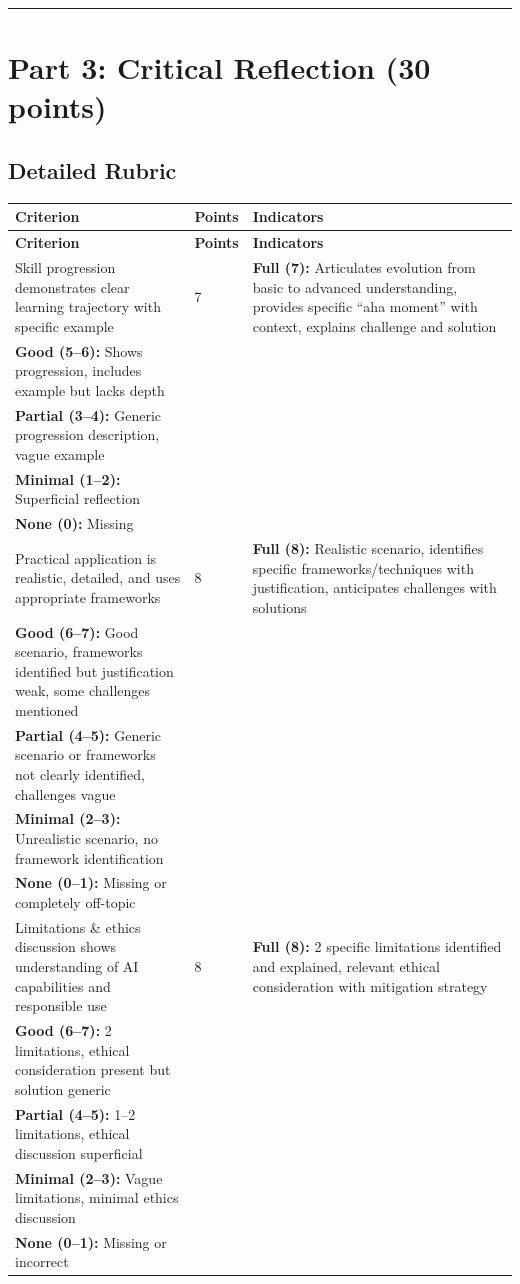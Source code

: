 \documentclass[11pt]{article}
\begin{document}
\hrule
\vspace{0.5cm}

\section{Part 3: Critical Reflection (30 points)}

\subsection*{Detailed Rubric}

\begin{longtable}{|p{5cm}|p{2cm}|p{8cm}|}
\hline
\textbf{Criterion} & \textbf{Points} & \textbf{Indicators} \\
\hline
\endfirsthead
\hline
\textbf{Criterion} & \textbf{Points} & \textbf{Indicators} \\
\hline
\endhead

Skill progression demonstrates clear learning trajectory with specific example & 7 & 
\textbf{Full (7):} Articulates evolution from basic to advanced understanding, provides specific ``aha moment'' with context, explains challenge and solution \\
\textbf{Good (5--6):} Shows progression, includes example but lacks depth \\
\textbf{Partial (3--4):} Generic progression description, vague example \\
\textbf{Minimal (1--2):} Superficial reflection \\
\textbf{None (0):} Missing \\
\hline

Practical application is realistic, detailed, and uses appropriate frameworks & 8 & 
\textbf{Full (8):} Realistic scenario, identifies specific frameworks/techniques with justification, anticipates challenges with solutions \\
\textbf{Good (6--7):} Good scenario, frameworks identified but justification weak, some challenges mentioned \\
\textbf{Partial (4--5):} Generic scenario or frameworks not clearly identified, challenges vague \\
\textbf{Minimal (2--3):} Unrealistic scenario, no framework identification \\
\textbf{None (0--1):} Missing or completely off-topic \\
\hline

Limitations \& ethics discussion shows understanding of AI capabilities and responsible use & 8 & 
\textbf{Full (8):} 2 specific limitations identified and explained, relevant ethical consideration with mitigation strategy \\
\textbf{Good (6--7):} 2 limitations, ethical consideration present but solution generic \\
\textbf{Partial (4--5):} 1--2 limitations, ethical discussion superficial \\
\textbf{Minimal (2--3):} Vague limitations, minimal ethics discussion \\
\textbf{None (0--1):} Missing or incorrect \\
\hline


\end{longtable}
\end{document}
